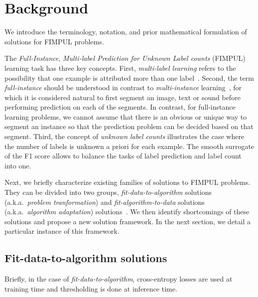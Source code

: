 
\section{Background}
\label{section:background}

We introduce the terminology, notation, and prior mathematical formulation of solutions for FIMPUL problems.

The \emph{Full-Instance}, \emph{Multi-label Prediction for Unknown Label counts} (FIMPUL) learning task has three key concepts. 
First, \emph{multi-label learning} refers to the possibility that one example is attributed more than one label~\cite{multilabelMethods}.
Second, the term \emph{full-instance} should be understood in contrast to \emph{multi-instance} learning~\citep[e.g.,][]{multiInstance,multiInstanceMultiLabel}, for which it is considered natural to first segment an image, text or sound before performing prediction on each of the segments. In contrast, for full-instance learning problems, we cannot assume that there is an obvious or unique way to segment an instance so that the prediction problem can be decided based on that segment.
Third, the concept of \emph{unknown label counts} illustrates the case where the number of labels is unknown a priori for each example. The smooth surrogate of the F1 score allows to balance the tasks of label prediction and label count into one.

Next, we briefly characterize existing families of solutions to FIMPUL problems. 
They can be divided into two groups, \emph{fit-data-to-algorithm} solutions (a.k.a.\ \emph{problem tranformation}) and \emph{fit-algorithm-to-data} solutions (a.k.a.\ \emph{algorithm adaptation}) solutions~\cite{multilabelReview}.
We then identify shortcomings of these solutions and propose a new solution framework. 
In the next section, we detail a particular instance of this framework.

\subsection{Fit-data-to-algorithm solutions} 
Briefly, in the case of \emph{fit-data-to-algorithm}, cross-entropy losses are used at training time and thresholding is done at inference time.

